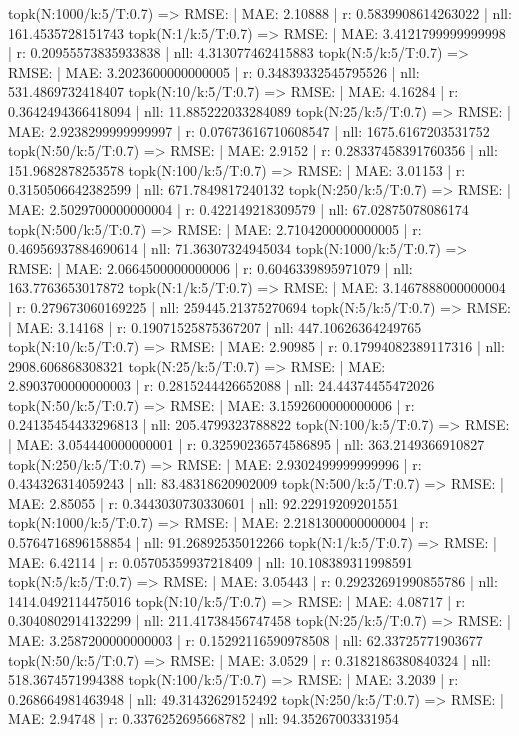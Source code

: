topk(N:1000/k:5/T:0.7) => RMSE: | MAE: 2.10888 | r: 0.5839908614263022 | nll: 161.4535728151743
topk(N:1/k:5/T:0.7) => RMSE: | MAE: 3.4121799999999998 | r: 0.20955573835933838 | nll: 4.313077462415883
topk(N:5/k:5/T:0.7) => RMSE: | MAE: 3.2023600000000005 | r: 0.34839332545795526 | nll: 531.4869732418407
topk(N:10/k:5/T:0.7) => RMSE: | MAE: 4.16284 | r: 0.3642494366418094 | nll: 11.885222033284089
topk(N:25/k:5/T:0.7) => RMSE: | MAE: 2.9238299999999997 | r: 0.07673616710608547 | nll: 1675.6167203531752
topk(N:50/k:5/T:0.7) => RMSE: | MAE: 2.9152 | r: 0.28337458391760356 | nll: 151.9682878253578
topk(N:100/k:5/T:0.7) => RMSE: | MAE: 3.01153 | r: 0.3150506642382599 | nll: 671.7849817240132
topk(N:250/k:5/T:0.7) => RMSE: | MAE: 2.5029700000000004 | r: 0.422149218309579 | nll: 67.02875078086174
topk(N:500/k:5/T:0.7) => RMSE: | MAE: 2.7104200000000005 | r: 0.46956937884690614 | nll: 71.36307324945034
topk(N:1000/k:5/T:0.7) => RMSE: | MAE: 2.0664500000000006 | r: 0.6046339895971079 | nll: 163.7763653017872
topk(N:1/k:5/T:0.7) => RMSE: | MAE: 3.1467888000000004 | r: 0.279673060169225 | nll: 259445.21375270694
topk(N:5/k:5/T:0.7) => RMSE: | MAE: 3.14168 | r: 0.19071525875367207 | nll: 447.10626364249765
topk(N:10/k:5/T:0.7) => RMSE: | MAE: 2.90985 | r: 0.17994082389117316 | nll: 2908.606868308321
topk(N:25/k:5/T:0.7) => RMSE: | MAE: 2.8903700000000003 | r: 0.2815244426652088 | nll: 24.44374455472026
topk(N:50/k:5/T:0.7) => RMSE: | MAE: 3.1592600000000006 | r: 0.24135454433296813 | nll: 205.4799323788822
topk(N:100/k:5/T:0.7) => RMSE: | MAE: 3.054440000000001 | r: 0.32590236574586895 | nll: 363.2149366910827
topk(N:250/k:5/T:0.7) => RMSE: | MAE: 2.9302499999999996 | r: 0.434326314059243 | nll: 83.48318620902009
topk(N:500/k:5/T:0.7) => RMSE: | MAE: 2.85055 | r: 0.3443030730330601 | nll: 92.22919209201551
topk(N:1000/k:5/T:0.7) => RMSE: | MAE: 2.2181300000000004 | r: 0.5764716896158854 | nll: 91.26892535012266
topk(N:1/k:5/T:0.7) => RMSE: | MAE: 6.42114 | r: 0.05705359937218409 | nll: 10.108389311998591
topk(N:5/k:5/T:0.7) => RMSE: | MAE: 3.05443 | r: 0.29232691990855786 | nll: 1414.0492114475016
topk(N:10/k:5/T:0.7) => RMSE: | MAE: 4.08717 | r: 0.3040802914132299 | nll: 211.41738456747458
topk(N:25/k:5/T:0.7) => RMSE: | MAE: 3.2587200000000003 | r: 0.15292116590978508 | nll: 62.33725771903677
topk(N:50/k:5/T:0.7) => RMSE: | MAE: 3.0529 | r: 0.3182186380840324 | nll: 518.3674571994388
topk(N:100/k:5/T:0.7) => RMSE: | MAE: 3.2039 | r: 0.268664981463948 | nll: 49.31432629152492
topk(N:250/k:5/T:0.7) => RMSE: | MAE: 2.94748 | r: 0.3376252695668782 | nll: 94.35267003331954

